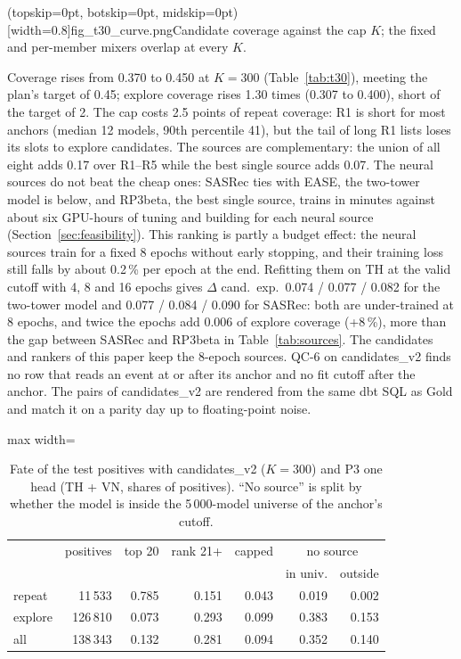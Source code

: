 \documentclass{ieeeaccess}
\makeatletter
\newcommand{\nCandOld}{0.370}        %
\newcommand{\nCandNew}{0.450}        %
\newcommand{\nExpOld}{0.307}         %
\newcommand{\nExpNew}{0.400}         %
\newcommand{\nK}{300}                %
\makeatother
\begin{document}
\Figure[t!](topskip=0pt, botskip=0pt, midskip=0pt)[width=0.8\textwidth]{fig_t30_curve.png}{Candidate coverage against the cap $K$; the fixed and per-member mixers overlap at every $K$.\label{fig:curve}}

Coverage rises from \nCandOld{} to \nCandNew{} at $K = \nK{}$ (Table~\ref{tab:t30}), meeting the plan's target of 0.45; explore coverage
rises 1.30 times (\nExpOld{} to \nExpNew{}), short of the target of 2. The cap costs 2.5 points of repeat coverage: R1 is short for most
anchors (median 12 models, 90th percentile 41), but the tail of long R1 lists loses its slots to explore candidates. The sources are complementary: the union of all eight adds 0.17 over R1--R5 while the
best single source adds 0.07. The neural sources do not beat the cheap ones: SASRec ties with EASE, the two-tower model is below,
and RP3beta, the best single source, trains in minutes against about six GPU-hours of tuning and building for each neural source
(Section~\ref{sec:feasibility}). This ranking is partly a budget effect: the neural sources train for a fixed 8 epochs without early
stopping, and their training loss still falls by about 0.2\,\% per epoch at the end. Refitting them on TH at the valid cutoff with 4,
8 and 16 epochs gives $\Delta$ cand.\ exp.\ 0.074 / 0.077 / 0.082 for the two-tower model and 0.077 / 0.084 / 0.090 for SASRec: both
are under-trained at 8 epochs, and twice the epochs add 0.006 of explore coverage (+8\,\%), more than the gap between SASRec and
RP3beta in Table~\ref{tab:sources}.
The candidates and rankers of this paper keep the 8-epoch sources. QC-6 on candidates\_v2 finds no row that reads an event at or after its anchor and no fit cutoff
after the anchor. The pairs of candidates\_v2 are rendered from the same dbt SQL as Gold and match it on a parity day up to
floating-point noise.

\begin{table}[t]
\caption{Fate of the test positives with candidates\_v2 ($K = \nK{}$) and P3 one head (TH + VN, shares of positives). ``No source''
is split by whether the model is inside the 5\,000-model universe of the anchor's cutoff.}
\label{tab:t28c}
\setlength{\tabcolsep}{3pt}
\centering
\begin{adjustbox}{max width=\columnwidth}
\begin{tabular}{lrrrrrr}
\toprule
 & positives & top 20 & rank 21+ & capped & \multicolumn{2}{c}{no source} \\
 & & & & & in univ. & outside \\
\midrule
repeat  & 11\,533  & 0.785 & 0.151 & 0.043 & 0.019 & 0.002 \\
explore & 126\,810 & 0.073 & 0.293 & 0.099 & 0.383 & 0.153 \\
all     & 138\,343 & 0.132 & 0.281 & 0.094 & 0.352 & 0.140 \\
\bottomrule
\end{tabular}
\end{adjustbox}
\end{table}
\end{document}
